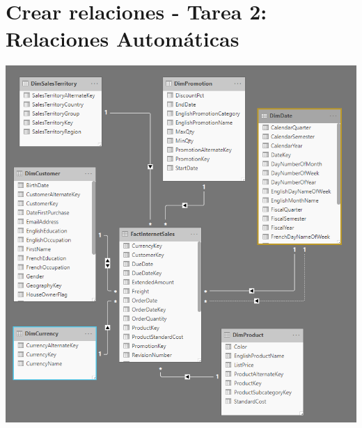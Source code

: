 \section{Crear relaciones - Tarea 2: Relaciones Automáticas} 

\begin{center}
\includegraphics[width=20cm]{./Imagenes/CapturaNro01}
\end{center}